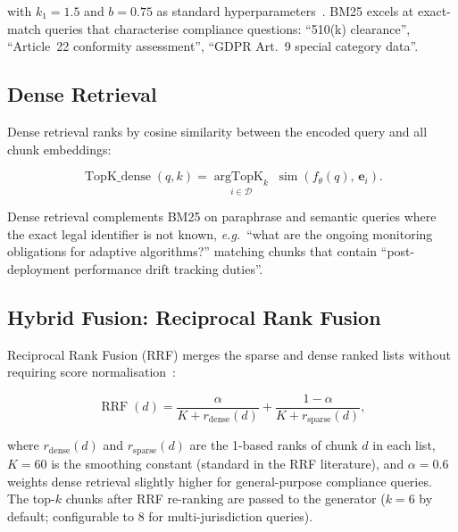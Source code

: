 with $k_1=1.5$ and $b=0.75$ as standard hyperparameters~\cite{robertson2009}.
BM25 excels at exact-match queries that characterise compliance questions:
``510(k) clearance'', ``Article~22 conformity assessment'', ``GDPR Art.~9
special category data''.

\subsection{Dense Retrieval}
\label{sec:rag-dense}

Dense retrieval ranks by cosine similarity between the encoded query and all
chunk embeddings:

\begin{equation}
\operatorname{TopK\_dense}(q, k) =
\underset{i\in\mathcal{D}}{\operatorname{argTopK}_k}\;
\operatorname{sim}\!\left(f_\theta(q),\,\mathbf{e}_i\right).
\end{equation}

Dense retrieval complements BM25 on paraphrase and semantic queries where the
exact legal identifier is not known, \textit{e.g.}\ ``what are the ongoing
monitoring obligations for adaptive algorithms?'' matching chunks that contain
``post-deployment performance drift tracking duties''.

\subsection{Hybrid Fusion: Reciprocal Rank Fusion}
\label{sec:rag-rrf}

Reciprocal Rank Fusion (RRF) merges the sparse and dense ranked lists without
requiring score normalisation~\cite{cormack2009}:

\begin{equation}
\label{eq:rrf-rag}
\operatorname{RRF}(d) =
\frac{\alpha}{K + r_{\mathrm{dense}}(d)} +
\frac{1-\alpha}{K + r_{\mathrm{sparse}}(d)},
\end{equation}

where $r_{\mathrm{dense}}(d)$ and $r_{\mathrm{sparse}}(d)$ are the 1-based ranks
of chunk $d$ in each list, $K=60$ is the smoothing constant (standard in the
RRF literature), and $\alpha=0.6$ weights dense retrieval slightly higher for
general-purpose compliance queries. The top-$k$ chunks after RRF re-ranking
are passed to the generator ($k=6$ by default; configurable to 8 for
multi-jurisdiction queries).

